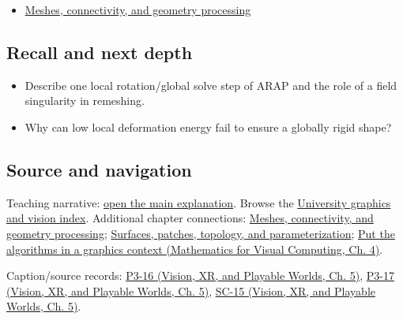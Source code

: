 \begin{itemize}
\tightlist
\item
  \hyperref[03-visual-computing-i-ch002-meshes-connectivity-and-geometry-processing]{Meshes, connectivity, and geometry processing}
\end{itemize}

\subsection{Recall and next depth}\label{appendix-7107009c505b-recall-and-next-depth}

\hypertarget{appendix-7107009c505b-recall-and-next-depth}{}

\begin{itemize}
\tightlist
\item
  Describe one local rotation/global solve step of ARAP and the role of a field singularity in remeshing.
\item
  Why can low local deformation energy fail to ensure a globally rigid shape?
\end{itemize}

\subsection{Source and navigation}\label{appendix-7107009c505b-source-and-navigation}

\hypertarget{appendix-7107009c505b-source-and-navigation}{}

Teaching narrative: \hyperref[03-visual-computing-i-ch002-meshes-connectivity-and-geometry-processing]{open the main explanation}. Browse the \hyperref[appendix-a6d556a4ef50-university-graphics-vision-and-photography---independent-series]{University graphics and vision index}. Additional chapter connections: \hyperref[03-visual-computing-i-ch002-meshes-connectivity-and-geometry-processing]{Meshes, connectivity, and geometry processing}; \hyperref[03-visual-computing-i-ch002-surfaces-patches-topology-and-parameterization]{Surfaces, patches, topology, and parameterization}; \href{../02-Mathematics-for-Visual-Computing/main.pdf\#nameddest=01-foundations-i-ch020-put-the-algorithms-in-a-graphics-context}{Put the algorithms in a graphics context (Mathematics for Visual Computing, Ch. 4)}.

Caption/source records: \href{../07-Vision-XR-and-Playable-Worlds/main.pdf\#nameddest=04-visual-computing-ii-ch036-p3-16---subdivision-surfaces-part-1}{P3-16 (Vision, XR, and Playable Worlds, Ch. 5)}, \href{../07-Vision-XR-and-Playable-Worlds/main.pdf\#nameddest=04-visual-computing-ii-ch036-p3-17---subdivision-surfaces-part-2}{P3-17 (Vision, XR, and Playable Worlds, Ch. 5)}, \href{../07-Vision-XR-and-Playable-Worlds/main.pdf\#nameddest=04-visual-computing-ii-ch036-sc-15---stanford-cs231n-deep-learning-for-computer-vision-spring-2025-lecture-15-3d-vision}{SC-15 (Vision, XR, and Playable Worlds, Ch. 5)}.
